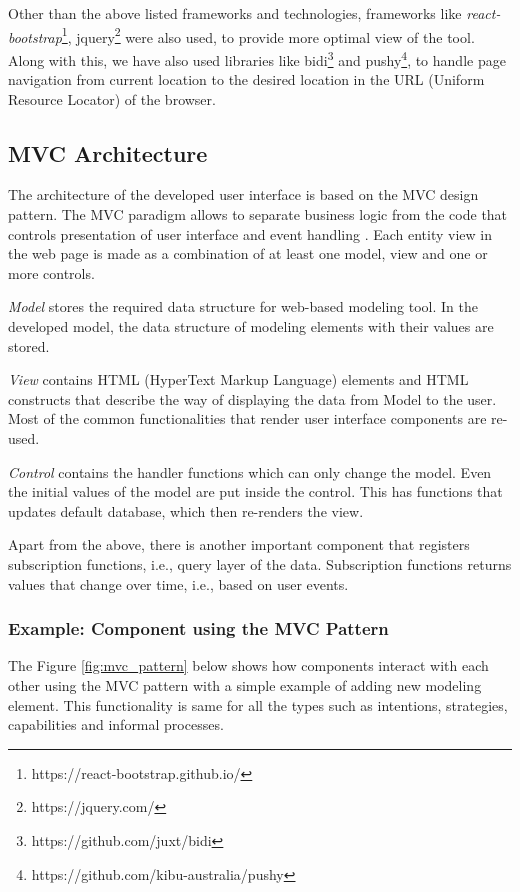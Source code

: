 Other than the above listed frameworks and technologies, frameworks like \textit{react-bootstrap}\footnote{https://react-bootstrap.github.io/}, jquery\footnote{https://jquery.com/} were also used, to provide more optimal view of the tool. Along with this, we have also used libraries like bidi\footnote{https://github.com/juxt/bidi} and pushy\footnote{https://github.com/kibu-australia/pushy}, to handle page navigation from current location to the desired location in the URL (Uniform Resource Locator) of the browser. 

\subsection{MVC Architecture}
\label{subsec:mvcarch}
The architecture of the developed user interface is based on the MVC design pattern. The MVC paradigm allows to separate business logic from the code that controls presentation of user interface and event handling \cite{Oracle2016}. Each entity view in the web page is made as a combination of at least one model, view and one or more controls. 

\textit{Model} stores the required data structure for web-based modeling tool. In the developed model, the data structure of modeling elements with their values are stored. 

\textit{View} contains HTML (HyperText Markup Language) elements and HTML constructs that describe the way of displaying the data from Model to the user. Most of the common functionalities that render user interface components are re-used. 

\textit{Control} contains the handler functions which can only change the model. Even the initial values of the model are put inside the control. This has functions that updates default database, which then re-renders the view. 

Apart from the above, there is another important component that registers subscription functions, i.e., query layer of the data. Subscription functions returns values that change over time, i.e., based on user events.

\subsubsection{Example: Component using the MVC Pattern }
The Figure \ref{fig:mvc_pattern} below shows how components interact with each other using the MVC pattern with a simple example of adding new modeling element. This functionality is same for all the types such as intentions, strategies, capabilities and informal processes.  

